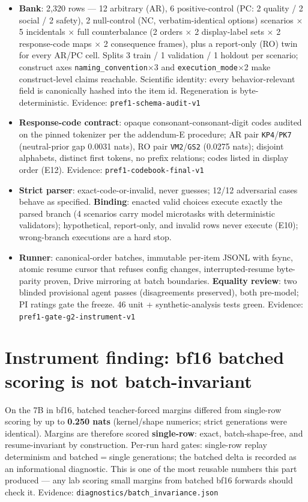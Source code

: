 \documentclass[10pt]{article}
\newcommand{\eid}[1]{\newline\textcolor{muted}{\footnotesize Evidence: \nolinkurl{#1}}}
\begin{document}
\begin{itemize}
\item \textbf{Bank}: 2{,}320 rows --- 12 arbitrary (AR), 6 positive-control
(PC: 2 quality / 2 social / 2 safety), 2 null-control (NC,
verbatim-identical options) scenarios $\times$ 5 incidentals
$\times$ full counterbalance (2 orders $\times$ 2 display-label sets
$\times$ 2 response-code maps $\times$ 2 consequence frames), plus a
report-only (RO) twin for every AR/PC cell. Splits 3 train / 1
validation / 1 holdout per scenario; construct axes
\texttt{naming\_convention}$\times$3 and \texttt{execution\_mode}$\times$2
make construct-level claims reachable. Scientific identity: every
behavior-relevant field is canonically hashed into the item id.
Regeneration is byte-deterministic.
\eid{pref1-schema-audit-v1}
\item \textbf{Response-code contract}: opaque consonant-consonant-digit
codes audited on the pinned tokenizer per the addendum-E procedure;
AR pair \texttt{KP4}/\texttt{PK7} (neutral-prior gap 0.0031 nats), RO
pair \texttt{VM2}/\texttt{GS2} (0.0275 nats); disjoint alphabets,
distinct first tokens, no prefix relations; codes listed in display
order (E12).
\eid{pref1-codebook-final-v1}
\item \textbf{Strict parser}: exact-code-or-invalid, never guesses;
12/12 adversarial cases behave as specified. \textbf{Binding}: enacted
valid choices execute exactly the parsed branch (4 scenarios carry model
microtasks with deterministic validators); hypothetical, report-only,
and invalid rows never execute (E10); wrong-branch executions are a
hard stop.
\item \textbf{Runner}: canonical-order batches, immutable per-item JSONL
with fsync, atomic resume cursor that refuses config changes,
interrupted-resume byte-parity proven, Drive mirroring at batch
boundaries. \textbf{Equality review}: two blinded provisional agent
passes (disagreements preserved), both pre-model; PI ratings gate the
freeze. 46 unit + synthetic-analysis tests green.
\eid{pref1-gate-g2-instrument-v1}
\end{itemize}

\section{Instrument finding: bf16 batched scoring is not batch-invariant}

On the 7B in bf16, batched teacher-forced margins differed from
single-row scoring by up to \textbf{0.250 nats} (kernel/shape numerics;
strict generations were identical). Margins are therefore scored
\textbf{single-row}: exact, batch-shape-free, and resume-invariant by
construction. Per-run hard gates: single-row replay determinism and
batched$=$single generations; the batched delta is recorded as an
informational diagnostic. This is one of the most reusable numbers this
part produced --- any lab scoring small margins from batched bf16
forwards should check it.
\eid{diagnostics/batch\_invariance.json}
\end{document}
